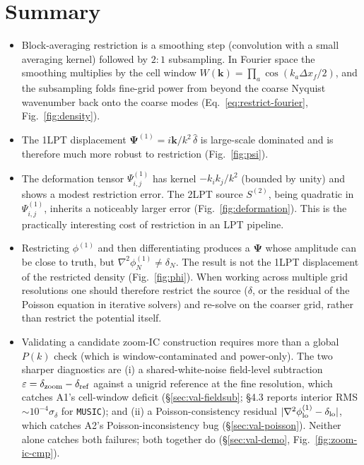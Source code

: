 \documentclass[12pt]{article}
\begin{document}
\section{Summary}

\begin{itemize}
\item Block-averaging restriction is a smoothing step (convolution with
      a small averaging kernel) followed by $2{:}1$ subsampling. In
      Fourier space the smoothing multiplies by the cell window
      $W(\mathbf k)=\prod_a\cos(k_a\Delta x_f/2)$, and the subsampling
      folds fine-grid power from beyond the coarse Nyquist wavenumber
      back onto the coarse modes (Eq.~\ref{eq:restrict-fourier},
      Fig.~\ref{fig:density}).
\item The 1LPT displacement $\boldsymbol{\Psi}^{(1)}=i\mathbf k/k^2\,\hat\delta$
      is large-scale dominated and is therefore much more robust to
      restriction (Fig.~\ref{fig:psi}).
\item The deformation tensor $\Psi^{(1)}_{i,j}$ has kernel
      $-k_ik_j/k^2$ (bounded by unity) and shows a modest restriction
      error. The 2LPT source $S^{(2)}$, being quadratic in
      $\Psi^{(1)}_{i,j}$, inherits a noticeably larger error
      (Fig.~\ref{fig:deformation}). This is the practically
      interesting cost of restriction in an LPT pipeline.
\item Restricting $\phi^{(1)}$ and then differentiating produces a
      $\boldsymbol{\Psi}$ whose amplitude can be close to truth, but
      $\nabla^2\phi^{(1)}_N\ne\delta_N$. The result is not the 1LPT
      displacement of the restricted density (Fig.~\ref{fig:phi}).
      When working across multiple grid resolutions one should therefore
      restrict the source ($\delta$, or the residual of the Poisson
      equation in iterative solvers) and re-solve on the coarser grid,
      rather than restrict the potential itself.
\item Validating a candidate zoom-IC construction requires more than
      a global $P(k)$ check (which is window-contaminated and
      power-only). The two sharper diagnostics are (i) a shared-white-noise
      field-level subtraction $\varepsilon = \delta_{\rm zoom}-\delta_{\rm ref}$
      against a unigrid reference at the fine resolution, which catches
      A1's cell-window deficit (\S\ref{sec:val-fieldsub};
      \citet{Hahn2011} \S 4.3 reports interior RMS
      $\sim 10^{-4}\sigma_\delta$ for \texttt{MUSIC}); and (ii) a
      Poisson-consistency residual
      $|\nabla^2\phi^{(1)}_{\rm lo}-\delta_{\rm lo}|$, which catches
      A2's Poisson-inconsistency bug (\S\ref{sec:val-poisson}). Neither
      alone catches both failures; both together do (\S\ref{sec:val-demo},
      Fig.~\ref{fig:zoom-ic-cmp}).
\end{itemize}
\end{document}
